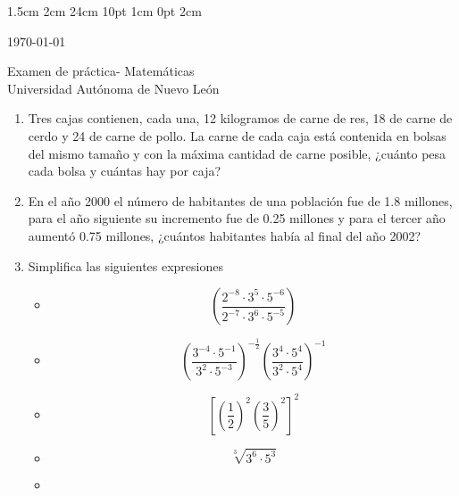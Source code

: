 \documentclass[12pt,letterpaper]{report}
\begin{document}
\setmargins{2.5cm}      
{1.5cm}                     
{2cm}  
{24cm}                    
{10pt}                          
{1cm}                          
{0pt}                             
{2cm} 
\begin{minipage}{0.3\linewidth}
\today
\end{minipage}
\begin{flushright}
\vspace*{-0.75cm}
\begin{minipage}{0.8\linewidth}
\begin{flushright}
Examen de práctica- Matemáticas\\
Universidad Autónoma de Nuevo León
\end{flushright}
\end{minipage}
\end{flushright}
\begin{enumerate}
\item Tres cajas contienen, cada una, 12 kilogramos de carne de res, 18 de carne de cerdo y 24 de carne de pollo. La carne
de cada caja está contenida en bolsas del mismo tamaño y con la máxima cantidad de carne posible, ¿cuánto pesa
cada bolsa y cuántas hay por caja?
\item En el año 2000 el número de habitantes de una población fue de 1.8 millones, para el año siguiente su incremento
fue de 0.25 millones y para el tercer año aumentó 0.75 millones, ¿cuántos habitantes había al final del año 2002?
\item Simplifica las siguientes expresiones
\begin{itemize}
\item[a)] 
\begin{equation*}
\left( \frac{2^{-8}\cdot 3^5 \cdot 5^{-6}}{2^{-7}\cdot 3^6 \cdot 5^{-5}} \right)
\end{equation*}
\item[b)]
\begin{equation*}
\left( \frac{3^{-4}\cdot 5^{-1}}{3^2 \cdot 5^{-3}}\right)^{-\frac{1}{2}} \left( \frac{3^4\cdot 5^4}{3^2 \cdot 5^4}\right)^{-1}
\end{equation*} 
\item[c)]
\begin{equation*}
\left[\left(\frac{1}{2}\right)^2 \left(\frac{3}{5}\right)^2  \right]^2
\end{equation*}
\item[d)]
\begin{equation*}
\sqrt[3]{3^6 \cdot 5^3 }
\end{equation*}
\item[f)]

\end{itemize}
\end{enumerate}
\end{document}

